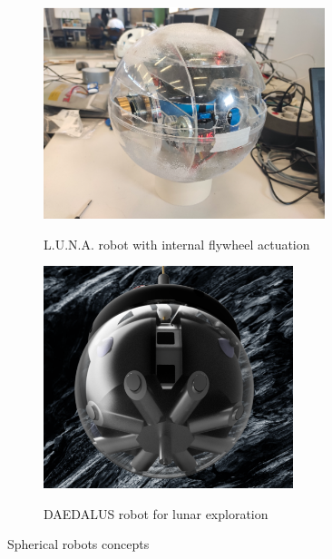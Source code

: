 \documentclass[english, bachelor, utf8]{base/thesis_telematics}
\begin{document}
\begin{figure}[h]
    \centering
\begin{subfigure}{0.48\textwidth}
    \centering
    \includegraphics[width=0.9\textwidth]{pics/luna.png}
    \label{fig:luna_flywheel}
    \caption{L.U.N.A. robot with internal flywheel actuation}
\end{subfigure}
\hfill
\begin{subfigure}{0.48\textwidth}
    \centering
    \includegraphics[width=0.8\textwidth]{pics/DAEDALUS.png}
    \label{fig:daedalus}
    \caption{DAEDALUS robot for lunar exploration\cite{esa_lunar_cave_explorer}}
\end{subfigure}
\label{fig:spherical_robots}
\caption{Spherical robots concepts}
\end{figure}
\end{document}
